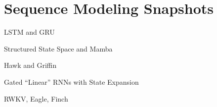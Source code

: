 \section[\sectopts,toc={History Samples}]{Sequence Modeling Snapshots}

\begin{slidewhite}[\slideopts, toc={LSTM \& GRU}]{LSTM and GRU}
\vspace{-6em}
\end{slidewhite}

\begin{slidewhite}[\slideopts, toc={SSM \& Mamba}]{Structured State Space and Mamba}
\vspace{-6em}
\end{slidewhite}

\begin{slidewhite}[\slideopts,toc={Hawk \& Griffin}]{Hawk and Griffin}
\vspace{-6em}
\end{slidewhite}

\begin{slidewhite}[\slideopts,toc={HGRN2}]{Gated ``Linear'' RNNs with State Expansion}
\vspace{-6em}
\end{slidewhite}

\begin{slidewhite}[\slideopts,toc={RWKV+}]{RWKV, Eagle, Finch}
\vspace{-6em}
\end{slidewhite}


%
%
%
%


\endinput
